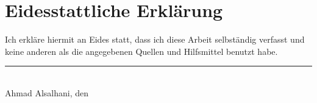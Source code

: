 
\cleardoublepage
\thispagestyle{plain}
\vspace*{\fill}

\section*{Eidesstattliche Erklärung}

Ich erkläre hiermit an Eides statt, dass ich diese Arbeit selbständig verfasst und keine
anderen als die angegebenen Quellen und Hilfsmittel benutzt habe.

\vskip2cm

\rule{5cm}{0.4pt}\\
Ahmad Alsalhani, den \duedate  \\
